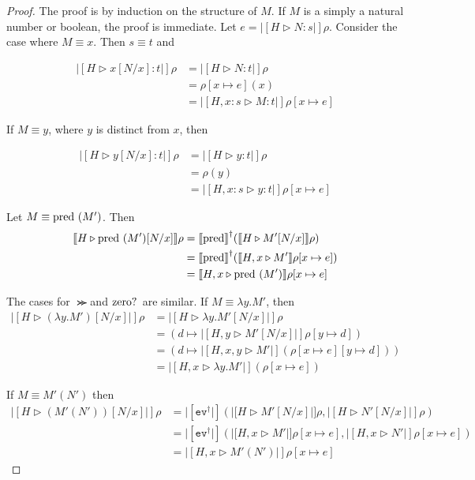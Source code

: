 \begin{proof}
The proof is by induction on the structure of $M$.  If $M$ is a simply a natural number or boolean, the proof is immediate.  
Let $e=|[H\triangleright N:s|]\rho$.  Consider the case where $M\equiv x$.  Then $s\equiv t$ and

\begin{align*}
|[H\triangleright x[N/x]:t|]\rho &= |[H \triangleright N:t|]\rho \\
&= \rho[x\mapsto e](x) \\
&= |[H,x:s\triangleright M:t|]\rho[x\mapsto e]
\end{align*}

If $M\equiv y$, where $y$ is distinct from $x$, then

\begin{align*}
|[H\triangleright y[N/x]:t|]\rho &= |[H \triangleright y:t|]\rho \\
&= \rho(y) \\
&= |[H,x:s\triangleright y:t|]\rho[x\mapsto e]
\end{align*}

Let $M\equiv \textrm{pred }(M')$.  Then
\begin{align*}
|[H\triangleright \textrm{pred }(M')[N/x]|]\rho &= |[\textrm{pred }\!\!|]^{\dagger}
(|[H\triangleright M'[N/x]|]\rho) \\
&= |[\textrm{pred }\!\!|]^{\dagger}(|[H,x \triangleright M'|]\rho[x\mapsto e]) \\
&= |[H,x \triangleright \textrm{pred }(M')|]\rho[x\mapsto e]
\end{align*}

The cases for $\Succ$and $\textrm{zero? }$are similar.  If $M\equiv \lambda y.M'$, then
\begin{align*}
|[H\triangleright (\lambda y.M')[N/x]|]\rho &= 
|[H\triangleright \lambda y.M'[N/x]|]\rho \\
&= (d\mapsto |[H,y\triangleright M'[N/x]|]\rho[y\mapsto d]) \\
&= (d\mapsto |[H,x,y\triangleright M'|](\rho[x\mapsto e][y\mapsto d])) \\
&= |[H,x\triangleright \lambda y.M'|](\rho[x\mapsto e])
\end{align*}

If $M\equiv M'(N')$ then
\begin{align*}
|[H\triangleright (M'(N'))[N/x]|]\rho &= 
|[\texttt{ev}^{\dagger}|](|[H\triangleright M'[N/x]|]\rho,
|[H\triangleright N'[N/x]|]\rho) \\
&= |[\texttt{ev}^{\dagger}|](|[H,x\triangleright M'|]\rho[x\mapsto e],
|[H,x\triangleright N'|]\rho[x\mapsto e]) \\
&= |[H,x\triangleright M'(N')|]\rho[x\mapsto e]
\end{align*}


\end{proof}
